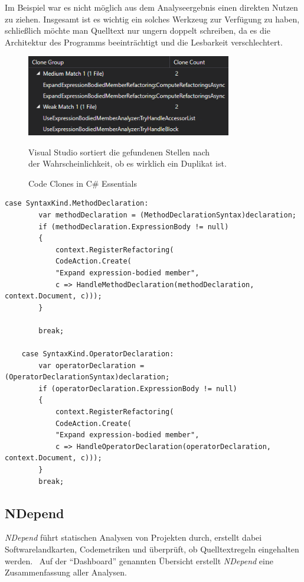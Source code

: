 Im Beispiel war es nicht möglich aus dem Analyseergebnis einen direkten Nutzen zu ziehen. Insgesamt ist es wichtig ein solches Werkzeug zur Verfügung zu haben, schließlich möchte man Quelltext nur ungern doppelt schreiben, da es die Architektur des Programms beeinträchtigt und die Lesbarkeit verschlechtert.

\begin{figure}[!ht]
	\centering
	\includegraphics[width=0.8\textwidth]{images/vs-code-clones.png}
	\caption{Code Clones in C\# Essentials}
	\vspace{0.1cm}
	Visual Studio sortiert die gefundenen Stellen nach\\ der Wahrscheinlichkeit, ob es wirklich ein Duplikat ist.
	\label{fig:vs-code-clones}
\end{figure}

\begin{minipage}{\textwidth}
	\begin{lstlisting}[caption={Visual Studio Medium Dublikat},
	label={lst:code-VSMediumDuplicate}]
	case SyntaxKind.MethodDeclaration:
		var methodDeclaration = (MethodDeclarationSyntax)declaration;
		if (methodDeclaration.ExpressionBody != null)
		{
			context.RegisterRefactoring(
			CodeAction.Create(
			"Expand expression-bodied member",
			c => HandleMethodDeclaration(methodDeclaration, context.Document, c)));
		}
		
		break;
		
	case SyntaxKind.OperatorDeclaration:
		var operatorDeclaration = (OperatorDeclarationSyntax)declaration;
		if (operatorDeclaration.ExpressionBody != null)
		{
			context.RegisterRefactoring(
			CodeAction.Create(
			"Expand expression-bodied member",
			c => HandleOperatorDeclaration(operatorDeclaration, context.Document, c)));
		}
		break;
	\end{lstlisting}
\end{minipage}

\subsection{NDepend}
\emph{NDepend} führt statischen Analysen von Projekten durch, erstellt dabei Softwarelandkarten, Codemetriken und überprüft, ob Quelltextregeln eingehalten werden.~\cite{ndepend} Auf der \enquote{Dashboard} genannten Übersicht erstellt \emph{NDepend} eine Zusammenfassung aller Analysen. 

